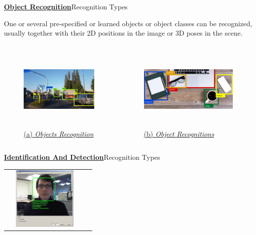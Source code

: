 \documentclass{beamer}
\begin{document}
{

\begin{frame}{\textbf{\underline{Object Recognition}}}{Recognition Types}\pause
{}
\begin{block}{}One or several pre-specified or learned objects or object classes can be recognized, usually together with their 2D positions in the image or 3D poses in the scene.\pause
\end{block}
\begin{columns}
\begin{figure}
\includegraphics[width=\textwidth,height=4cm]{Objreco1.jpeg}
\caption{\underline{(a) \textit{Objects Recognition}}}\pause
\end{figure}
\begin{figure}
\includegraphics[width=\textwidth,height=4cm]{Objreco2.jpeg}
\caption{\underline{(b) \textit{Object Recognitions}}}\pause
\end{figure}
\end{columns}
\end{frame}


\begin{frame}{\textbf{\underline{Identification And Detection}}}{Recognition Types}
\pause


\begin{tabular}{cc}
	\begin{minipage}{4cm}
		\includegraphics[height=3cm,width=4cm]{Identify1.jpeg}
		

\end{minipage}
\end{tabular}
\end{frame}}
\end{document}
